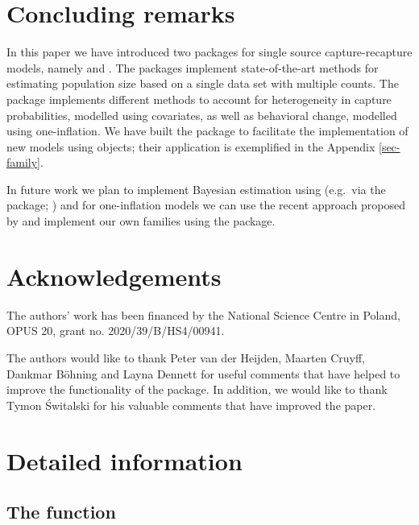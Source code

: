 \documentclass[
]{jss}
\newcommand{\1}{\mathcal{I}} \newcommand{\bZero}{\boldsymbol{0}}
\begin{document}
\section{Concluding remarks}\label{concluding-remarks}

In this paper we have introduced two packages for single source
capture-recapture models, namely  and
. The packages implement state-of-the-art
methods for estimating population size based on a single data set with
multiple counts. The package implements different methods to account for
heterogeneity in capture probabilities, modelled using covariates, as
well as behavioral change, modelled using one-inflation. We have built
the package to facilitate the implementation of new models using
 objects; their application is exemplified in the Appendix
\ref{sec-family}.

In future work we plan to implement Bayesian estimation using
 (e.g.~via the  package;
\cite{carpenter2017stan, brms}) and for one-inflation models we can use
the recent approach proposed by \cite{tuoto2022bayesian} and implement
our own families using the  package.

\section{Acknowledgements}\label{Acknowledgements}

The authors' work has been financed by the National Science Centre in
Poland, OPUS 20, grant no. 2020/39/B/HS4/00941.

The authors would like to thank Peter van der Heijden, Maarten Cruyff,
Dankmar Böhning and Layna Dennett for useful comments that have helped
to improve the functionality of the package. In addition, we would like
to thank Tymon Świtalski for his valuable comments that have improved
the paper.

\appendix

\section{Detailed information}\label{sec-details}

\subsection[The estimatePopsizeFit function]{The
 function}\label{sec-estimatePopsizeFit}
\end{document}
